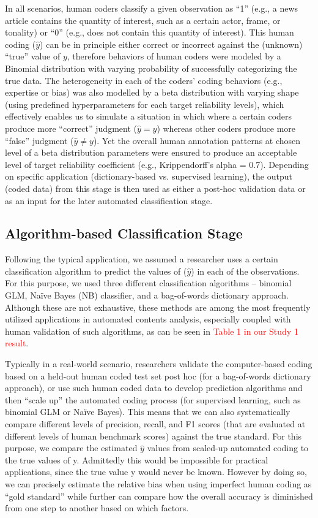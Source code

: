 \documentclass[man, 12pt, a4paper, nolmodern, noextraspace]{apa6}
\begin{document}
    In all scenarios, human coders classify a given observation as ``1'' (e.g., a news article contains the quantity of interest, such as a certain actor, frame, or tonality) or ``0'' (e.g., does not contain this quantity of interest). This human coding ($\hat{y}$) can be in principle either correct or incorrect against the (unknown) “true” value of $y$, therefore behaviors of human coders were modeled by a Binomial distribution with varying probability of successfully categorizing the true data. The heterogeneity in each of the coders’ coding behaviors (e.g., expertise or bias) was also modelled by a beta distribution with varying shape (using predefined hyperparameters for each target reliability levels), which effectively enables us to simulate a situation in which where a certain coders produce more “correct” judgment ($\hat{y} = y$) whereas other coders produce more ``false'' judgment ($\hat{y} \neq y$). Yet the overall human annotation patterns at chosen level of a beta distribution parameters were ensured to produce an acceptable level of target reliability coefficient (e.g., Krippendorff's alpha = 0.7). Depending on specific application (dictionary-based vs. supervised learning), the output (coded data) from this stage is then used as either a post-hoc validation data or as an input for the later automated classification stage. 
    
    \subsection{Algorithm-based Classification Stage}
    
    Following the typical application, we assumed a researcher uses a certain classification algorithm to predict the values of ($\hat{y}$) in each of the observations. For this purpose, we used three different classification algorithms – binomial GLM, Naïve Bayes (NB) classifier, and a bag-of-words dictionary approach. Although these are not exhaustive, these methods are among the most frequently utilized applications in automated contents analysis, especially coupled with human validation of such algorithms, as can be seen in \textcolor{red}{Table 1 in our Study 1 result}. 
    
    Typically in a real-world scenario, researchers validate the computer-based coding based on a held-out human coded test set post hoc (for a bag-of-words dictionary approach), or use such human coded data to develop prediction algorithms and then ``scale up'' the automated coding process (for supervised learning, such as binomial GLM or Naïve Bayes). This means that we can also systematically compare different levels of precision, recall, and F1 scores (that are evaluated at different levels of human benchmark scores) against the true standard. For this purpose, we compare the estimated $\hat{y}$ values from scaled-up automated coding to the true values of y. Admittedly this would be impossible for practical applications, since the true value y would never be known. However by doing so, we can precisely estimate the relative bias when using imperfect human coding as \enquote{gold standard} while further can compare how the overall accuracy is diminished from one step to another based on which factors. 
    
\end{document}
